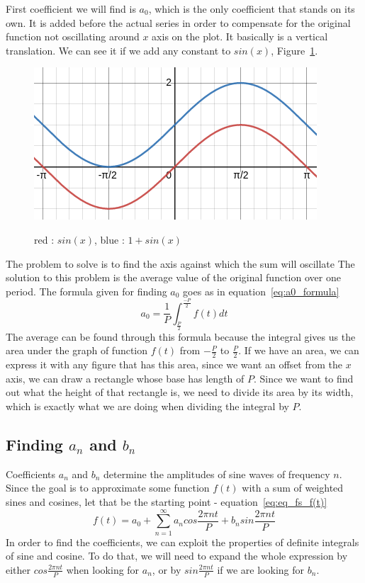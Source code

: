 \documentclass[titlepage]{article}
\begin{document}
    First coefficient we will find is $a_0$, which is the only coefficient that 
    stands on its own. It is added before the actual series in order to compensate
    for the original function not oscillating around $x$ axis on the plot. It 
    basically is a vertical translation. We can see it if we add any constant
    to $sin(x)$, Figure~\ref{fig:sine_translation}.
    \begin{figure}[H]
        \caption{red : $sin(x)$, blue : $1 + sin(x)$}
        \centering
        \includegraphics[width=0.5\linewidth]{translated_vanilla_sinewave}
        \label{fig:sine_translation}
    \end{figure}
    The problem to solve is to find the axis against which the sum will oscillate
    The solution to this problem is the average
    value of the original function over one period. The formula given for finding
    $a_0$ goes as in equation~\eqref{eq:a0_formula}
    \begin{equation}\label{eq:a0_formula}
        a_0 = \frac{1}{P}\int_{\frac{P}{2}}^{\frac{-P}{2}}f(t)dt
    \end{equation}
    The average can be found through this formula because the 
    integral gives us the area under the graph of function $f(t)$ from 
    $-\frac{P}{2}$ to $\frac{P}{2}$. If we have an area, we can express it with 
    any figure that has this area, since we want an offset from the $x$ axis, 
    we can draw a rectangle whose base has length of $P$. Since we want to find
    out what the height of that rectangle is, we need to divide its area by its
    width, which is exactly what we are doing when dividing the integral by $P$.

\subsection{Finding $a_n$ and $b_n$}

    Coefficients $a_n$ and $b_n$ determine the amplitudes of sine waves of frequency
    $n$. Since the goal is to approximate some function $f(t)$ with a sum of 
    weighted sines and cosines, let that be the starting point - equation~\eqref{eq:eq_fs_f(t)}
    \begin{equation} \label{eq:eq_fs_f(t)}
        f(t) = a_0 + \sum_{n=1}^{\infty}a_ncos\frac{2\pi nt}{P} + b_n%
            sin\frac{2\pi nt}{P}
    \end{equation}
    In order to find the coefficients, we can exploit the properties of definite
    integrals of sine and cosine. To do that, we will need to expand the whole 
    expression by either $cos\frac{2\pi nt}{P}$ when looking for $a_n$, or by 
    $sin\frac{2\pi nt}{P}$ if we are looking for $b_n$. 
\end{document}
